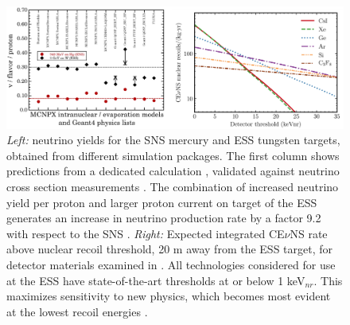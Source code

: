 \documentclass[12pt]{article}
\begin{document}
\begin{figure}[H]
\begin{center}
\includegraphics[width=5.1in]{fig1.eps}
\caption{\label{fig:fig1}\scriptsize {\it Left:} neutrino yields for the SNS mercury and
  ESS tungsten targets, obtained from different simulation packages. The first column shows predictions from a dedicated
  calculation \cite{burman,report}, validated against neutrino cross
  section measurements \cite{louis}. The combination of increased neutrino yield per proton and larger proton current on target of the ESS generates an increase in neutrino production rate by a factor 9.2 with respect to the SNS \cite{ESS}. {\it Right:} Expected integrated  CE$\nu$NS rate above nuclear recoil threshold, 20 m away from the ESS target, for detector materials examined in \cite{ESS}. All technologies considered for use at the ESS have state-of-the-art thresholds at or below 1 keV$_{nr}$. This maximizes sensitivity to new physics, which becomes most evident at the lowest recoil energies \cite{ESS}. }
\end{center}
\end{figure}
\end{document}
